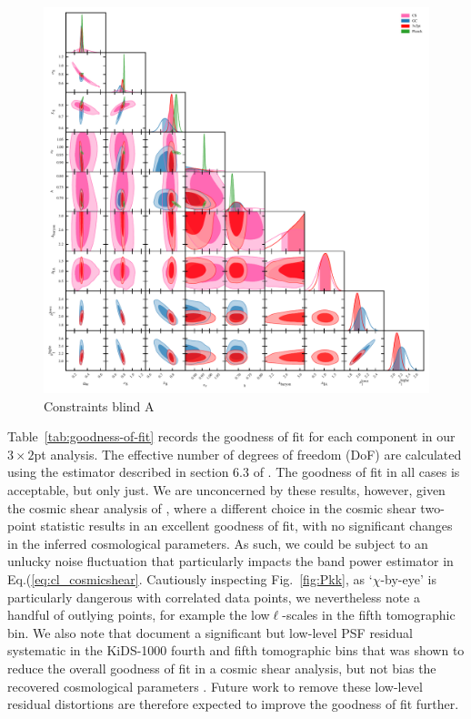 \begin{figure}
	\begin{center}
		\includegraphics[width=\textwidth]{Parameter_Plots/cosmology/omegam_sigma8_s8_ns_h_a_baryon_a_ia_b1l_b1h_blind_A}
		\caption{Constraints blind A}
		\label{fig:cosmology-params-all}
	\end{center}
\end{figure}

Table~\ref{tab:goodness-of-fit} records the goodness of fit for each component in our $3\times2$pt analysis.  The effective number of degrees of freedom (DoF) are calculated using the estimator described in section 6.3 of \citet{joachimi/etal:inprep}.   The goodness of fit in all cases is acceptable, but only just.    We are unconcerned by these results, however, given the cosmic shear analysis of \citet{asgari/etal:inprep}, where a different choice in the cosmic shear two-point statistic results in an excellent goodness of fit, with no significant changes in the inferred cosmological parameters.    As such, we could be subject to an unlucky noise fluctuation that particularly impacts the band power estimator in Eq.(\ref{eq:cl_cosmicshear}.  Cautiously inspecting Fig.~\ref{fig:Pkk}, as `$\chi$-by-eye' is particularly dangerous with correlated data points, we nevertheless note a handful of outlying points, for example the low$\ell$-scales in the fifth tomographic bin.   We also note that \citet{giblin/etal:inprep} document a significant but low-level PSF residual systematic in the KiDS-1000 fourth and fifth tomographic bins that was shown to reduce the overall goodness of fit in a cosmic shear analysis, but not bias the recovered cosmological parameters \citep[see also the discussion in][]{amara/refregier:2008}.  Future work to remove these low-level residual distortions are therefore expected to improve the goodness of fit further.

